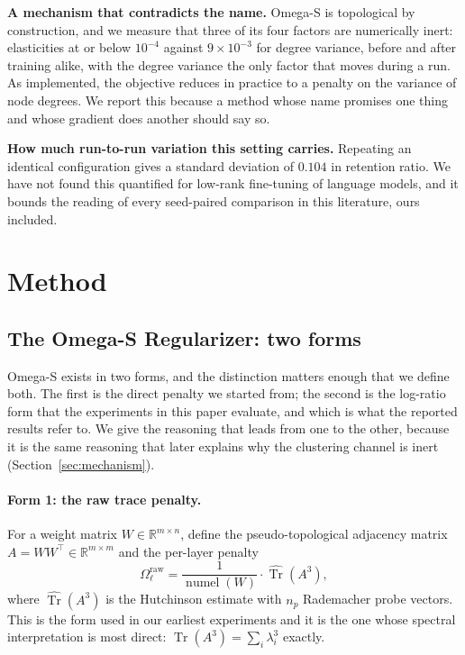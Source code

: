 \documentclass[11pt,a4paper]{article}
\begin{document}
\textbf{A mechanism that contradicts the name.} Omega-S is topological by
construction, and we measure that three of its four factors are numerically
inert: elasticities at or below $10^{-4}$ against $9 \times 10^{-3}$ for degree
variance, before and after training alike, with the degree variance the only
factor that moves during a run. As implemented, the objective reduces in
practice to a penalty on the variance of node degrees. We report this because a
method whose name promises one thing and whose gradient does another should say
so.

\textbf{How much run-to-run variation this setting carries.} Repeating an
identical configuration gives a standard deviation of $0.104$ in retention
ratio. We have not found this quantified for low-rank fine-tuning of language
models, and it bounds the reading of every seed-paired comparison in this
literature, ours included.



\section{Method}

\subsection{The Omega-S Regularizer: two forms}
\label{sec:twoforms}

Omega-S exists in two forms, and the distinction matters enough that we define
both. The first is the direct penalty we started from; the second is the
log-ratio form that the experiments in this paper evaluate, and which is what
the reported results refer to. We give the reasoning that leads from one to
the other, because it is the same reasoning that later explains why the
clustering channel is inert (Section~\ref{sec:mechanism}).

\paragraph{Form 1: the raw trace penalty.} For a weight matrix
$W \in \mathbb{R}^{m \times n}$, define the pseudo-topological adjacency
matrix $A = WW^\top \in \mathbb{R}^{m \times m}$ and the per-layer penalty
\begin{equation}
  \Omega^{\text{raw}}_\ell = \frac{1}{\operatorname{numel}(W)} \cdot
  \widehat{\operatorname{Tr}}(A^3),
\label{eq:raw}
\end{equation}
where $\widehat{\operatorname{Tr}}(A^3)$ is the Hutchinson estimate with
$n_p$ Rademacher probe vectors. This is the form used in our earliest
experiments and it is the one whose spectral interpretation is most direct:
$\operatorname{Tr}(A^3) = \sum_i \lambda_i^3$ exactly.
\end{document}
